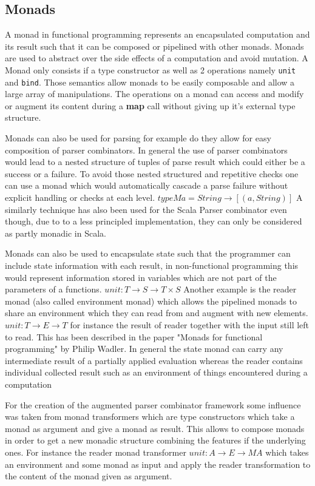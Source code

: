\subsection{Monads}
A monad in functional programming represents an encapsulated computation and its result such that it can be composed or pipelined with other monads. Monads are used to abstract over the side effects of a computation and avoid mutation. A Monad only consists if a type constructor as well as 2 operations namely \verb/unit/ and \verb/bind/. Those semantics allow monads to be easily composable and allow a large array of manipulations. The operations on a monad can access and modify or augment its content during a \textbf{map} call without giving up it's external type structure.
 
Monads can also be used for parsing for example do they allow for easy composition of parser combinators. In general the use of parser combinators would lead to a nested structure of tuples of parse result which could either be a success or a failure. To avoid those nested structured and repetitive checks one can use a monad which would automatically cascade a parse failure without explicit handling or checks at each level.
$type M a = String \rightarrow [(a, String)]$
A similarly technique has also been used for the Scala Parser combinator even though, due to to a less principled implementation, they can only be considered as partly monadic in Scala.

Monads can also be used to encapsulate state such that the programmer can include state information with each result, in non-functional programming this would represent information stored in variables which are not part of the parameters of a functions.
$unit: T \rightarrow S \rightarrow T \times S $
Another example is the reader monad (also called environment monad) which allows the pipelined monads to share an environment which they can read from and augment with new elements.
$unit: T \rightarrow E \rightarrow T $
for instance the result of reader together with the input still left to read. This has been described in the paper "Monads for functional programming" by Philip Wadler. In general the state monad can carry any intermediate result of a partially applied evaluation whereas the reader contains individual collected result such as an environment of things encountered during a computation

For the creation of the augmented parser combinator framework some influence was taken from monad transformers which are type constructors which take a monad as argument and give a monad as result. This allows to compose monads in order to get a new monadic structure combining the features if the underlying ones. For instance the reader monad transformer
$unit: A \rightarrow E \rightarrow M A $ which takes an environment and some monad as input and apply the reader transformation to the content of the monad given as argument. 

